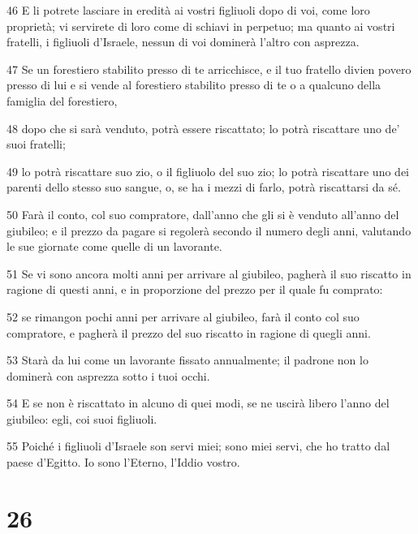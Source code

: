 \par 46 E li potrete lasciare in eredità ai vostri figliuoli dopo di voi, come loro proprietà; vi servirete di loro come di schiavi in perpetuo; ma quanto ai vostri fratelli, i figliuoli d'Israele, nessun di voi dominerà l'altro con asprezza.
\par 47 Se un forestiero stabilito presso di te arricchisce, e il tuo fratello divien povero presso di lui e si vende al forestiero stabilito presso di te o a qualcuno della famiglia del forestiero,
\par 48 dopo che si sarà venduto, potrà essere riscattato; lo potrà riscattare uno de' suoi fratelli;
\par 49 lo potrà riscattare suo zio, o il figliuolo del suo zio; lo potrà riscattare uno dei parenti dello stesso suo sangue, o, se ha i mezzi di farlo, potrà riscattarsi da sé.
\par 50 Farà il conto, col suo compratore, dall'anno che gli si è venduto all'anno del giubileo; e il prezzo da pagare si regolerà secondo il numero degli anni, valutando le sue giornate come quelle di un lavorante.
\par 51 Se vi sono ancora molti anni per arrivare al giubileo, pagherà il suo riscatto in ragione di questi anni, e in proporzione del prezzo per il quale fu comprato:
\par 52 se rimangon pochi anni per arrivare al giubileo, farà il conto col suo compratore, e pagherà il prezzo del suo riscatto in ragione di quegli anni.
\par 53 Starà da lui come un lavorante fissato annualmente; il padrone non lo dominerà con asprezza sotto i tuoi occhi.
\par 54 E se non è riscattato in alcuno di quei modi, se ne uscirà libero l'anno del giubileo: egli, coi suoi figliuoli.
\par 55 Poiché i figliuoli d'Israele son servi miei; sono miei servi, che ho tratto dal paese d'Egitto. Io sono l'Eterno, l'Iddio vostro.

\chapter{26}

